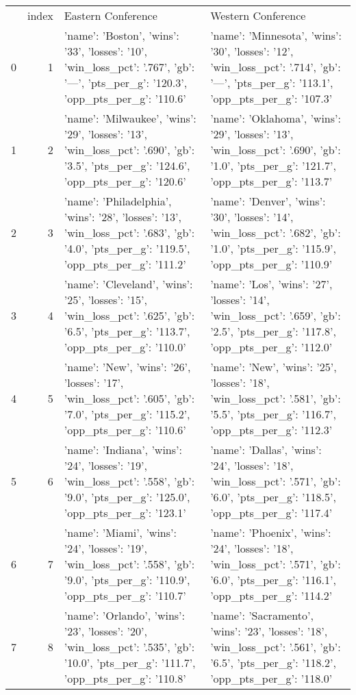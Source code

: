 \begin{tabular}{lrll}
 & index & Eastern Conference & Western Conference \\
0 & 1 & {'name': 'Boston', 'wins': '33', 'losses': '10', 'win_loss_pct': '.767', 'gb': '—', 'pts_per_g': '120.3', 'opp_pts_per_g': '110.6'} & {'name': 'Minnesota', 'wins': '30', 'losses': '12', 'win_loss_pct': '.714', 'gb': '—', 'pts_per_g': '113.1', 'opp_pts_per_g': '107.3'} \\
1 & 2 & {'name': 'Milwaukee', 'wins': '29', 'losses': '13', 'win_loss_pct': '.690', 'gb': '3.5', 'pts_per_g': '124.6', 'opp_pts_per_g': '120.6'} & {'name': 'Oklahoma', 'wins': '29', 'losses': '13', 'win_loss_pct': '.690', 'gb': '1.0', 'pts_per_g': '121.7', 'opp_pts_per_g': '113.7'} \\
2 & 3 & {'name': 'Philadelphia', 'wins': '28', 'losses': '13', 'win_loss_pct': '.683', 'gb': '4.0', 'pts_per_g': '119.5', 'opp_pts_per_g': '111.2'} & {'name': 'Denver', 'wins': '30', 'losses': '14', 'win_loss_pct': '.682', 'gb': '1.0', 'pts_per_g': '115.9', 'opp_pts_per_g': '110.9'} \\
3 & 4 & {'name': 'Cleveland', 'wins': '25', 'losses': '15', 'win_loss_pct': '.625', 'gb': '6.5', 'pts_per_g': '113.7', 'opp_pts_per_g': '110.0'} & {'name': 'Los', 'wins': '27', 'losses': '14', 'win_loss_pct': '.659', 'gb': '2.5', 'pts_per_g': '117.8', 'opp_pts_per_g': '112.0'} \\
4 & 5 & {'name': 'New', 'wins': '26', 'losses': '17', 'win_loss_pct': '.605', 'gb': '7.0', 'pts_per_g': '115.2', 'opp_pts_per_g': '110.6'} & {'name': 'New', 'wins': '25', 'losses': '18', 'win_loss_pct': '.581', 'gb': '5.5', 'pts_per_g': '116.7', 'opp_pts_per_g': '112.3'} \\
5 & 6 & {'name': 'Indiana', 'wins': '24', 'losses': '19', 'win_loss_pct': '.558', 'gb': '9.0', 'pts_per_g': '125.0', 'opp_pts_per_g': '123.1'} & {'name': 'Dallas', 'wins': '24', 'losses': '18', 'win_loss_pct': '.571', 'gb': '6.0', 'pts_per_g': '118.5', 'opp_pts_per_g': '117.4'} \\
6 & 7 & {'name': 'Miami', 'wins': '24', 'losses': '19', 'win_loss_pct': '.558', 'gb': '9.0', 'pts_per_g': '110.9', 'opp_pts_per_g': '110.7'} & {'name': 'Phoenix', 'wins': '24', 'losses': '18', 'win_loss_pct': '.571', 'gb': '6.0', 'pts_per_g': '116.1', 'opp_pts_per_g': '114.2'} \\
7 & 8 & {'name': 'Orlando', 'wins': '23', 'losses': '20', 'win_loss_pct': '.535', 'gb': '10.0', 'pts_per_g': '111.7', 'opp_pts_per_g': '110.8'} & {'name': 'Sacramento', 'wins': '23', 'losses': '18', 'win_loss_pct': '.561', 'gb': '6.5', 'pts_per_g': '118.2', 'opp_pts_per_g': '118.0'} \\

\end{tabular}
